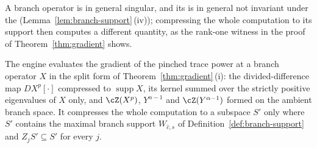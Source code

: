 
A branch operator is in general singular, and its
 is in general not invariant under the
 (Lemma~\ref{lem:branch-support}\,(iv)); compressing the whole
computation to its support then computes a different quantity, as the
rank-one witness in the proof of Theorem~\ref{thm:gradient} shows.

\begin{requirement}\label{req:split-form-gradient}
The engine evaluates the gradient of the pinched trace power at a branch
operator $X$ in the split form of Theorem~\ref{thm:gradient}\,(i): the
divided-difference map $DX^{p}[\cdot]$ compressed to
$\operatorname{supp}X$, its kernel summed over the strictly positive
eigenvalues of $X$ only, and $\cZ(X^{p})$, $Y^{\alpha-1}$ and
$\cZ(Y^{\alpha-1})$ formed on the ambient branch space. It compresses the
whole computation to a subspace $S'$ only where $S'$ contains the maximal
branch support $W_{\hat c,s}$ of Definition~\ref{def:branch-support} and
$Z_jS'\subseteq S'$ for every $j$.
\end{requirement}
